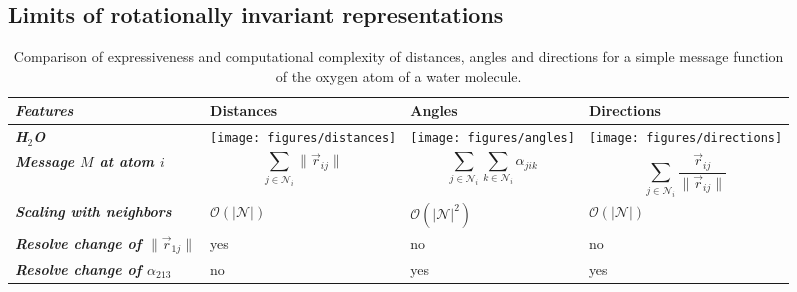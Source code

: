 \documentclass[reprint,
amsmath,amssymb,
 aip,jcp
]{revtex4-2}
\begin{document}
\subsection{Limits of rotationally invariant representations}
\begin{table}[tb]
\caption{Comparison of expressiveness and computational complexity of distances, angles and directions for a simple message function of the oxygen atom of a water molecule.}
\label{tab:equivariant}
\begin{center}
\begin{scriptsize}
\begin{tabularx}{\columnwidth}{>{\centering\arraybackslash}m{2cm}|>{\centering\arraybackslash}m{2.1cm}>{\centering\arraybackslash}m{2.1cm}>{\centering\arraybackslash}m{2.1cm}}
\toprule
\textbf{\textit{Features}} & \textbf{Distances} & \textbf{Angles} & \textbf{Directions} \\ \midrule
 \textit{\textbf{H$_2$O}} \vspace{0.5cm} & \texttt{[image: figures/distances]} & \texttt{[image: figures/angles]} & \texttt{[image: figures/directions]}  \\
 \textit{\textbf{Message $M$ at atom $i$}} \vspace{0.3cm} & \[ \sum_{j \in \mathcal{N}_i} \| \vec{r}_{ij} \| \]  &  \[ \sum_{j \in \mathcal{N}_i} \sum_{k \in \mathcal{N}_{i}} \alpha_{jik} \]  &  \[ \sum_{j \in \mathcal{N}_i} \frac{\vec{r}_{ij}}{\| \vec{r}_{ij} \|}  \]  \\
\textit{\textbf{Scaling with neighbors}} & $\mathcal{O}(|\mathcal{N}|)$ \vspace{0.1cm} &  $\mathcal{O}(|\mathcal{N}|^2)$ \vspace{0.1cm} &  $\mathcal{O}(|\mathcal{N}|)$ \vspace{0.1cm} \\
\vspace{0.2cm} \textit{\textbf{Resolve change of $\| \vec{r}_{1j} \|$}} & yes \vspace{0.1cm} & no \vspace{0.1cm} &  no \vspace{0.1cm} \\
\vspace{0.2cm} \textit{\textbf{Resolve change of $\alpha_{213}$}} &   no \vspace{0.08cm}& yes \vspace{0.08cm}&  yes \vspace{0.08cm}\\
\bottomrule
\end{tabularx}
\end{scriptsize}
\end{center}
\end{table}
\end{document}
